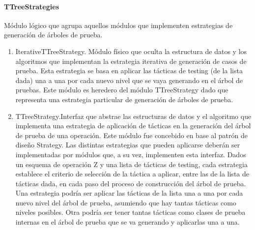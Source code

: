 \documentclass[a4paper,10pt]{report}
\begin{document}
				\paragraph{TTreeStrategies}
				Módulo lógico que agrupa aquellos módulos que implementen estrategias de generación de árboles de prueba.
					\begin{enumerate}
						\item{IterativeTTreeStrategy. Módulo físico que oculta la estructura de datos y los algoritmos que implementan la estrategia iterativa de generación de casos de prueba. Esta estrategia se basa en aplicar las tácticas de testing (de la lista dada) una a una por cada nuevo nivel que se vaya generando en el árbol de pruebas. Este módulo es heredero del módulo TTreeStrategy dado que representa una estrategia particular de generación de árboles de prueba.}
						\item{TTreeStrategy.Interfaz que abstrae las estructuras de datos y el algoritmo que implementa una estrategia de aplicación de tácticas en la generación del árbol de prueba de una operación. Este módulo fue concebido en base al patrón de diseño Strategy. Las distintas estrategias que pueden aplicarse deberán ser implementadas por módulos que, a su vez, implementen esta interfaz. Dados un esquema de operación Z y una lista de tácticas de testing, cada estrategia establece el criterio de selección de la táctica a aplicar, entre las de la lista de tácticas dada, en cada paso del proceso de construcción del árbol de prueba. Una estrategia podría ser aplicar las tácticas de la lista una a una por cada nuevo nivel del árbol de prueba, asumiendo que hay tantas tácticas como niveles posibles. Otra podría ser tener tantas tácticas como clases de prueba internas en el árbol de prueba que se va generando y aplicarlas una a una.}
					\end{enumerate}
\end{document}
